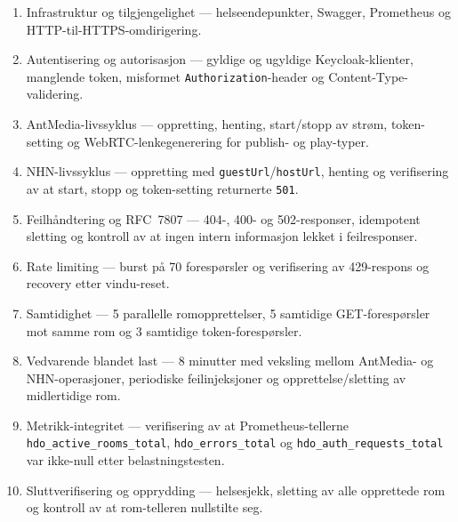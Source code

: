 \begin{enumerate}
  \item Infrastruktur og tilgjengelighet --- helseendepunkter,
        Swagger, Prometheus og HTTP-til-HTTPS-omdirigering.
  \item Autentisering og autorisasjon --- gyldige og ugyldige
        Keycloak-klienter, manglende token, misformet
        \texttt{Authorization}-header og Content-Type-validering.
  \item AntMedia-livssyklus --- oppretting, henting, start/stopp av
        strøm, token-setting og WebRTC-lenkegenerering for publish-
        og play-typer.
  \item NHN-livssyklus --- oppretting med \texttt{guestUrl}/\texttt{hostUrl},
        henting og verifisering av at start, stopp og token-setting
        returnerte \texttt{501}.
  \item Feilhåndtering og RFC~7807 --- 404-, 400- og 502-responser,
        idempotent sletting og kontroll av at ingen intern informasjon
        lekket i feilresponser.
  \item Rate limiting --- burst på 70 forespørsler og verifisering av
        429-respons og recovery etter vindu-reset.
  \item Samtidighet --- 5 parallelle romopprettelser, 5 samtidige
        GET-forespørsler mot samme rom og 3 samtidige token-forespørsler.
  \item Vedvarende blandet last --- 8 minutter med veksling mellom
        AntMedia- og NHN-operasjoner, periodiske feilinjeksjoner og
        opprettelse/sletting av midlertidige rom.
  \item Metrikk-integritet --- verifisering av at Prometheus-tellerne
        \texttt{hdo\_active\_rooms\_total}, \texttt{hdo\_errors\_total}
        og \texttt{hdo\_auth\_requests\_total} var ikke-null etter
        belastningstesten.
  \item Sluttverifisering og opprydding --- helsesjekk, sletting av
        alle opprettede rom og kontroll av at rom-telleren
        nullstilte seg.
\end{enumerate}


